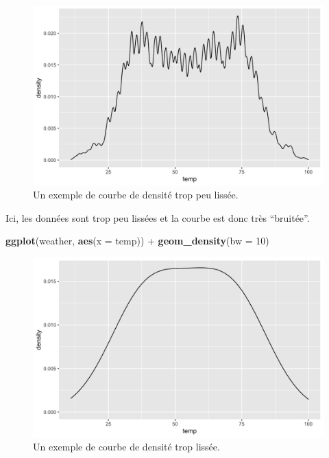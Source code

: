 \documentclass[
  a4paper,
]{article}
\newenvironment{Shaded}{\begin{snugshade}}{\end{snugshade}}
\newcommand{\DataTypeTok}[1]{\textcolor[rgb]{0.00,0.34,0.68}{#1}}
\newcommand{\DecValTok}[1]{\textcolor[rgb]{0.69,0.50,0.00}{#1}}
\newcommand{\KeywordTok}[1]{\textcolor[rgb]{0.12,0.11,0.11}{\textbf{#1}}}
\newcommand{\NormalTok}[1]{\textcolor[rgb]{0.12,0.11,0.11}{#1}}
\newcommand{\OperatorTok}[1]{\textcolor[rgb]{0.12,0.11,0.11}{#1}}
\newcommand{\StringTok}[1]{\textcolor[rgb]{0.75,0.01,0.01}{#1}}
\begin{document}
\begin{figure}[htpb]

{\centering \includegraphics[width=0.9\linewidth]{figure/densitynarrow-1} 

}

\caption{Un exemple de courbe de densité trop peu lissée.}\label{fig:densitynarrow}
\end{figure}

Ici, les données sont trop peu lissées et la courbe est donc très ``bruitée''.

\begin{Shaded}
\begin{Highlighting}[]
\KeywordTok{ggplot}\NormalTok{(weather, }\KeywordTok{aes}\NormalTok{(}\DataTypeTok{x =}\NormalTok{ temp)) }\OperatorTok{+}
\StringTok{  }\KeywordTok{geom_density}\NormalTok{(}\DataTypeTok{bw =} \DecValTok{10}\NormalTok{)}
\end{Highlighting}
\end{Shaded}

\begin{figure}[htpb]

{\centering \includegraphics[width=0.9\linewidth]{figure/densitywide-1} 

}

\caption{Un exemple de courbe de densité trop lissée.}\label{fig:densitywide}
\end{figure}
\end{document}

